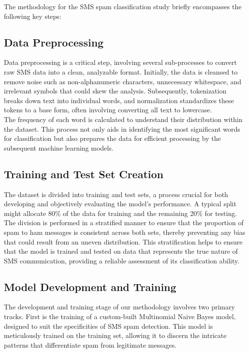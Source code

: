 \documentclass[12pt]{article}
\begin{document}
The methodology for the SMS spam classification study briefly encompasses the following key steps:

\subsection{Data Preprocessing}
Data preprocessing is a critical step, involving several sub-processes to convert raw SMS data into a clean, analyzable format. Initially, the data is cleansed to remove noise such as non-alphanumeric characters, unnecessary whitespace, and irrelevant symbols that could skew the analysis. Subsequently, tokenization breaks down text into individual words, and normalization standardizes these tokens to a base form, often involving converting all text to lowercase.\\

The frequency of each word is calculated to understand their distribution within the dataset. This process not only aids in identifying the most significant words for classification but also prepares the data for efficient processing by the subsequent machine learning models.

\subsection{Training and Test Set Creation}
The dataset is divided into training and test sets, a process crucial for both developing and objectively evaluating the model's performance. A typical split might allocate 80\% of the data for training and the remaining 20\% for testing. The division is performed in a stratified manner to ensure that the proportion of spam to ham messages is consistent across both sets, thereby preventing any bias that could result from an uneven distribution. This stratification helps to ensure that the model is trained and tested on data that represents the true nature of SMS communication, providing a reliable assessment of its classification ability.

\subsection{Model Development and Training}
The development and training stage of our methodology involves two primary tracks. First is the training of a custom-built Multinomial Naive Bayes model, designed to suit the specificities of SMS spam detection. This model is meticulously trained on the training set, allowing it to discern the intricate patterns that differentiate spam from legitimate messages.\\
\end{document}
